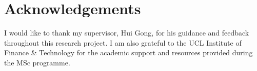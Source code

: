 \section*{Acknowledgements}

I would like to thank my supervisor, Hui Gong, for his guidance and feedback
throughout this research project. I am also grateful to the UCL Institute of
Finance \& Technology for the academic support and resources provided during
the MSc programme.
